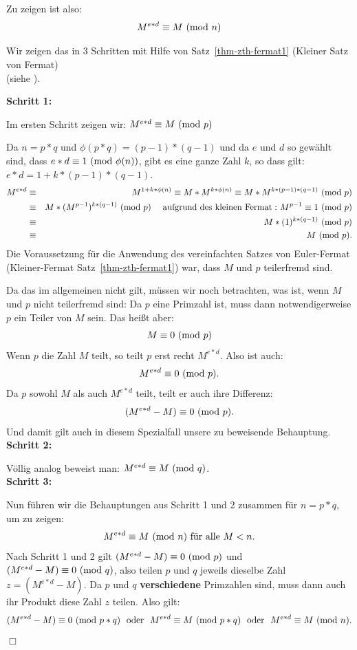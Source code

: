 \begin{refsegment}
 Zu zeigen ist also:
   $$ M^{e * d}  \equiv  M  {\rm ~(mod~} n) $$

 Wir zeigen das in 3 Schritten mit Hilfe von Satz~\ref{thm-zth-fermat1} (Kleiner Satz von Fermat)\\ (siehe \cite[S. 131ff]{Beutelspacher1996}).

 \textbf{Schritt 1:}

 Im ersten Schritt zeigen wir: $M^{e * d} \equiv M{\rm ~(mod~}p)$

 Da $n=p*q$ und $\phi(p*q)=(p-1)*(q-1)$ und da $e$ und $d$ so gewählt sind, dass $e*d \equiv 1 {\rm ~(mod~}\phi(n))$,
gibt es eine ganze Zahl $k$, so dass gilt: $e*d = 1 + k*(p-1)*(q-1)$.
\begin{eqnarray*}
M^{e * d}  & \equiv & M^{1+k*\phi(n)} \equiv M * M^{k*\phi(n)} \equiv M * M^{k*(p-1)*(q-1)}{\rm ~(mod~}p) \nonumber\\
           & \equiv & M * (M^{p-1})^{k*(q-1)}{\rm ~(mod~}p) \quad {\rm ~aufgrund~des~kleinen~Fermat:~}
                  M^{p-1} \equiv 1 {\rm~(mod~}p) \nonumber\\
           & \equiv & M * (1)^{k*(q-1)} {\rm~(mod~}p) \nonumber\\
       & \equiv & M {\rm ~(mod~}p). \nonumber
\end{eqnarray*}
Die Voraussetzung für die Anwendung des vereinfachten Satzes von Euler-Fermat
(Kleiner-Fermat Satz~\ref{thm-zth-fermat1}) war, dass $M$ und $p$
teilerfremd sind.

Da das im allgemeinen nicht gilt, müssen wir noch betrachten, was ist, wenn
$M$ und $p$ nicht teilerfremd sind: Da $p$ eine Primzahl ist, muss dann
notwendigerweise $p$ ein Teiler von $M$ sein. Das heißt aber:
$$  M \equiv 0 {\rm ~(mod~}p) $$
Wenn $p$ die Zahl $M$ teilt, so teilt $p$ erst recht $M^{e * d}$. Also ist auch:
$$M^{e * d} \equiv 0 {\rm ~(mod~}p).$$
Da $p$ sowohl $M$ als auch $M^{e * d}$ teilt, teilt er auch ihre Differenz:
$$ (M^{e * d} - M ) \equiv 0 {\rm ~(mod~}p).$$
Und damit gilt auch in diesem Spezialfall unsere zu beweisende Behauptung.\\

 \textbf{Schritt 2:}

 Völlig analog beweist man:  $M^{e * d} \equiv M{\rm ~(mod~}q)$.\\

 \textbf{Schritt 3:}

 Nun führen wir die Behauptungen aus Schritt 1 und 2 zusammen für
$n=p*q$, um zu zeigen:
$$ M^{e * d} \equiv M{\rm ~(mod~}n) \mbox{~für~alle~} M < n. $$
Nach Schritt 1 und 2 gilt $(M^{e * d} - M) \equiv 0 {\rm ~(mod~} p)$ und $(M^{e * d} - M) \equiv 0 {\rm ~(mod~} q)$,
also teilen $p$ und $q$ jeweils dieselbe Zahl $z = (M^{e * d} - M)$.
Da $p$ und $q$ \textbf{verschiedene} Primzahlen sind, muss dann auch ihr Produkt diese Zahl $z$ teilen. Also gilt:
$$
(M^{e * d} - M) \equiv 0 {\rm ~(mod~}p*q) {\rm ~~oder~~ } M^{e * d} \equiv M {\rm ~(mod~}p*q) {\rm ~~oder~~}
 M^{e * d} \equiv M {\rm ~(mod~}n).
$$
\hfill$\Box$



\end{refsegment}

